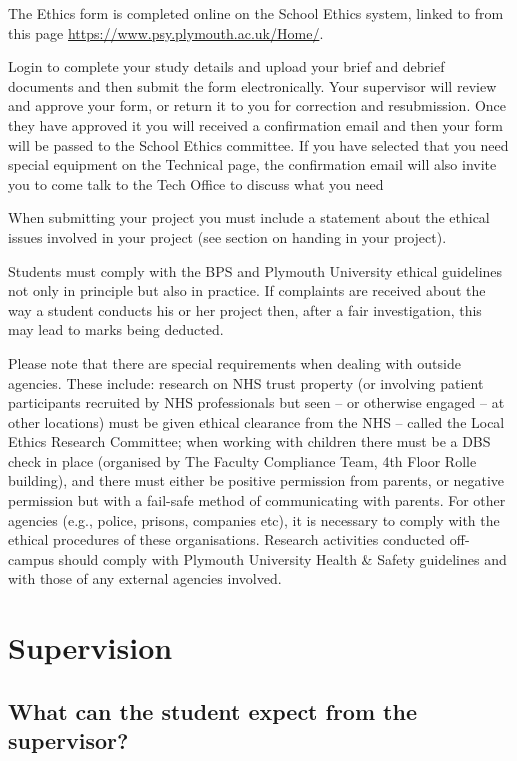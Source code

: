 \documentclass[
]{book}
\begin{document}
The Ethics form is completed online on the School Ethics system, linked to from this page \url{https://www.psy.plymouth.ac.uk/Home/}.

Login to complete your study details and upload your brief and debrief documents and then submit the form electronically. Your supervisor will review and approve your form, or return it to you for correction and resubmission. Once they have approved it you will received a confirmation email and then your form will be passed to the School Ethics committee. If you have selected that you need special equipment on the Technical page, the confirmation email will also invite you to come talk to the Tech Office to discuss what you need

When submitting your project you must include a statement about the ethical issues involved in your project (see section on handing in your project).

Students must comply with the BPS and Plymouth University ethical guidelines not only in principle but also in practice. If complaints are received about the way a student conducts his or her project then, after a fair investigation, this may lead to marks being deducted.

Please note that there are special requirements when dealing with outside agencies. These include: research on NHS trust property (or involving patient participants recruited by NHS professionals but seen -- or otherwise engaged -- at other locations) must be given ethical clearance from the NHS -- called the Local Ethics Research Committee; when working with children there must be a DBS check in place (organised by The Faculty Compliance Team, 4th Floor Rolle building), and there must either be positive permission from parents, or negative permission but with a fail-safe method of communicating with parents. For other agencies (e.g., police, prisons, companies etc), it is necessary to comply with the ethical procedures of these organisations. Research activities conducted off-campus should comply with Plymouth University Health \& Safety guidelines and with those of any external agencies involved.

\chapter{Supervision}\label{supervision}

\section{What can the student expect from the supervisor?}\label{what-can-the-student-expect-from-the-supervisor}
\end{document}
